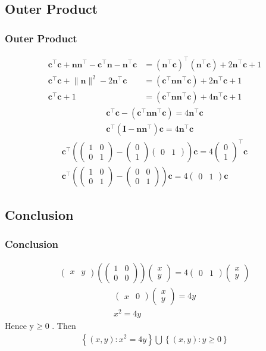 \documentclass{beamer}
\providecommand{\brak}[1]{\ensuremath{\left(#1\right)}}
\providecommand{\cbrak}[1]{\ensuremath{\left\{#1\right\}}}
\theoremstyle{remark}
\providecommand{\norm}[1]{\lVert#1\rVert}
\newcommand{\myvec}[1]{\ensuremath{\begin{pmatrix}#1\end{pmatrix}}}
\let\vec\mathbf
\numberwithin{equation}{section}
\begin{document}
\subsection{Outer Product}
\begin{frame}
\frametitle{Outer Product}
\begin{align}
\vec{c}^\top\vec{c}+\vec{n}\vec{n}^\top-\vec{c}^\top\vec{n}-\vec{n}^\top\vec{c}&=\brak{\vec{n}^\top\vec{c}}^\top\brak{\vec{n}^\top\vec{c}}+2\vec{n}^\top\vec{c}+1\\
\vec{c}^\top\vec{c}+\norm{\vec{n}}^2-2\vec{n}^\top\vec{c}&=\brak{\vec{c}^\top\vec{n}\vec{n}^\top\vec{c}}+2\vec{n}^\top\vec{c}+1 \\
\vec{c}^\top\vec{c}+1&=\brak{\vec{c}^\top\vec{n}\vec{n}^\top\vec{c}}+4\vec{n}^\top\vec{c}+1 
\end{align}
\begin{align}
\vec{c}^\top\vec{c}-\brak{\vec{c}^\top\vec{n}\vec{n}^\top\vec{c}}=4\vec{n}^\top\vec{c} \\
\vec{c}^\top\brak{\vec{I}-\vec{n}\vec{n}^\top}\vec{c}=4\vec{n}^\top\vec{c} 
\end{align}
\begin{align}
\vec{c}^\top\brak{\myvec{1&0\\0&1}-\myvec{0\\1}\myvec{0&1}}\vec{c}=4\myvec{0\\1}^\top\vec{c} \\
\vec{c}^\top\brak{\myvec{1&0\\0&1}-\myvec{0&0\\0&1}}\vec{c}=4\myvec{0&1}\vec{c} 
\end{align}
\end{frame}
\subsection{Conclusion}
\begin{frame}
\frametitle{Conclusion}
\begin{align}
 \myvec{x&y}\brak{\myvec{1&0\\0&0}}\myvec{x\\y}=4\myvec{0&1}\myvec{x\\y} 
 \end{align}
 \begin{align}
\myvec{x&0}\myvec{x\\y}=4y \\
x^2=4y
\end{align}
Hence y$\geq$0 . Then
\begin{align}
    \cbrak{\brak{x,y}:x^2=4y} \bigcup \cbrak{\brak{x,y}:y\geq0}
\end{align}
 \end{frame}
\end{document}
